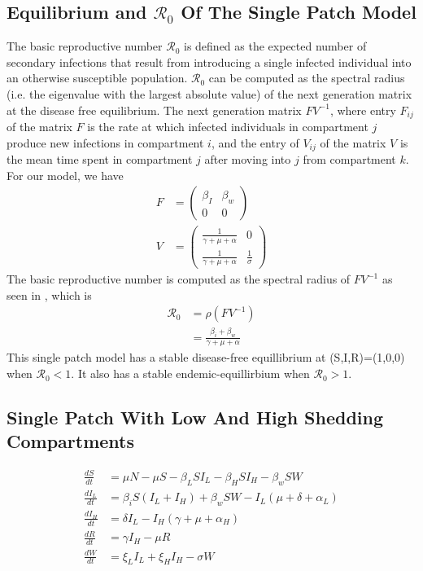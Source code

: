 \documentclass[12pt]{article}\usepackage[]{graphicx}\usepackage[]{color}
\begin{document}
\subsection{Equilibrium and {$\mathcal R_0$} Of The Single Patch Model}

The basic reproductive number ${\mathcal R_0}$ is defined as the expected number of secondary infections that result from introducing a single infected individual into an otherwise susceptible
population.
${\mathcal R_0}$ can be computed as the spectral radius (i.e. the eigenvalue with the largest absolute value) of the next generation matrix at the disease free equilibrium.
The next generation matrix $FV^{−1}$, where entry $F_{ij}$ of the matrix $F$ is the rate at which infected individuals in compartment $j$ produce new infections in compartment $i$, and the entry of $V_{ij}$ of the matrix $V$ is the mean time spent in compartment $j$ after moving into $j$ from compartment $k$.
For our model, we have
\begin{align*}
		F&=\begin{pmatrix}
			\beta_I & \beta_w\\
			0 & 0
			\end{pmatrix}\\
		V&=\begin{pmatrix}
			\frac{1}{\gamma+\mu+\alpha} & 0\\
			\frac{1}{\gamma+\mu+\alpha} &\frac{1}{\sigma}
			\end{pmatrix}
\end{align*}
The basic reproductive number is computed as the spectral radius of $FV^{-1}$ as seen in \cite{link9}, which is
\begin{align*}
    {\mathcal R_0} &= \rho(FV^{-1})\\
		           &=\frac{\beta_i+\beta_w}{\gamma+\mu+\alpha}
\end{align*}
This single patch model has a stable disease-free equillibrium at (S,I,R)=(1,0,0) when ${\mathcal R_0}<1$.
It also has a stable endemic-equillirbium when ${\mathcal R_0}>1$.

\subsection{Single Patch With Low And High Shedding Compartments}

\begin{align*}
	\frac{dS}{dt}&= \mu N - \mu S - \beta_L S I_L - \beta_H S I_H - \beta_w S W  \\
	\frac{dI_L}{dt}&= \beta_i S( I_L + I_H) + \beta_w S W - I_L (\mu + \delta + \alpha_L) \\
	\frac{dI_H}{dt}&= \delta I_L - I_H (\gamma + \mu + \alpha_H) \\
	\frac{dR}{dt}&= \gamma I_H - \mu R \\
	\frac{dW}{dt}&= \xi_L I_L + \xi_H I_H  - \sigma W\\
	\end{align*}
\end{document}
